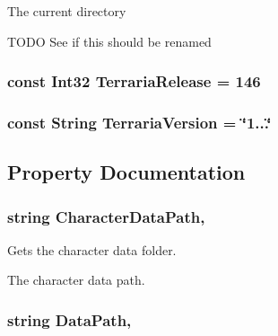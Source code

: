 The current directory 

T\+O\+D\+O See if this should be renamed \hypertarget{classOTA_1_1Globals_a3d964aaf7b8872b2d5cb2a9ac9b32840}{}
\subsubsection[{Terraria\+Release}]{\setlength{\rightskip}{0pt plus 5cm}const Int32 Terraria\+Release = 146}\label{classOTA_1_1Globals_a3d964aaf7b8872b2d5cb2a9ac9b32840}
\hypertarget{classOTA_1_1Globals_a1ba09245aa3166afea05144efe8a8067}{}
\subsubsection[{Terraria\+Version}]{\setlength{\rightskip}{0pt plus 5cm}const String Terraria\+Version = \char`\"{}1...\char`\"{}}\label{classOTA_1_1Globals_a1ba09245aa3166afea05144efe8a8067}


\subsection{Property Documentation}
\hypertarget{classOTA_1_1Globals_a49e428f54c23031933ef157260562220}{}
\subsubsection[{Character\+Data\+Path}]{\setlength{\rightskip}{0pt plus 5cm}string Character\+Data\+Path\hspace{0.3cm}{\ttfamily [static]}, {\ttfamily [get]}}\label{classOTA_1_1Globals_a49e428f54c23031933ef157260562220}


Gets the character data folder. 

The character data path.\hypertarget{classOTA_1_1Globals_adcc849904fa894695354aa9994c85b45}{}
\subsubsection[{Data\+Path}]{\setlength{\rightskip}{0pt plus 5cm}string Data\+Path\hspace{0.3cm}{\ttfamily [static]}, {\ttfamily [get]}}\label{classOTA_1_1Globals_adcc849904fa894695354aa9994c85b45}


